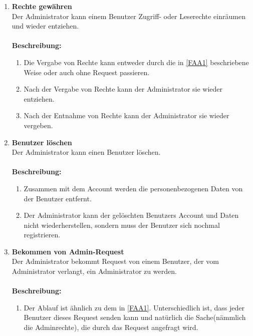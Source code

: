 \documentclass[parskip=full,11pt]{scrartcl}
\def\threedigits#1{%
  \ifnum#1<10 0\fi
  \ifnum#1<1 0\fi
  \number#1}
\begin{document}
\begin{enumerate}[label={\textbf{/F\protect\threedigits{\theenumi}0/}}, leftmargin=*, resume]
\item \label{FAA3} \textbf{Rechte gewähren}\\ Der Administrator kann einem Benutzer Zugriff- oder Leserechte einräumen und wieder entziehen.\\\\
\textbf{Beschreibung:}\\
\begin{enumerate}[label=(\arabic*), leftmargin=*]
	\item Die Vergabe von Rechte kann entweder durch die in \ref{FAA1} beschriebene Weise oder auch ohne Request passieren.\\
	\item Nach der Vergabe von Rechte kann der Administrator sie wieder entziehen. \\ 
	\item Nach der Entnahme von Rechte kann der Administrator sie wieder vergeben. \\
	\end{enumerate}

\item \label{FAA4} \textbf{Benutzer löschen}\\ Der Administrator kann einen Benutzer löschen. \\\\
\textbf{Beschreibung:}\\
\begin{enumerate}[label=(\arabic*), leftmargin=*]
	\item Zusammen mit dem Account werden die personenbezogenen Daten von der Benutzer entfernt.\\
	\item Der Administrator kann der gelöschten Benutzers Account und Daten nicht wiederherstellen, sondern muss der Benutzer sich nochmal registrieren. \\ 
	\end{enumerate}

\item \label{FAA5} \colorbox{shadecolor} {\textbf{Bekommen von Admin-Request}}\\ Der Administrator bekommt Request von einem Benutzer, der vom Administrator verlangt, ein Administrator zu werden.\\\\
\textbf{Beschreibung:}\\
\begin{enumerate}[label=(\arabic*), leftmargin=*]
	\item Der Ablauf ist ähnlich zu dem in \ref{FAA1}. Unterschiedlich ist, dass jeder Benutzer dieses Request senden kann und natürlich die Sache(nämmlich die Adminrechte), die durch das Request angefragt wird.\\
	\end{enumerate}




\end{enumerate}
\end{document}
